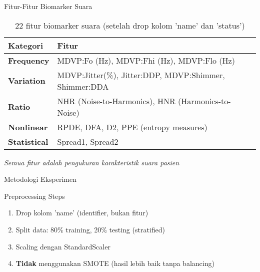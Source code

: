 \documentclass[aspectratio=169]{beamer}
\begin{document}
\begin{frame}{Fitur-Fitur Biomarker Suara}
\begin{table}
\centering
\small
\begin{tabular}{lp{7cm}}
\toprule
\textbf{Kategori} & \textbf{Fitur} \\
\midrule
\textbf{Frequency} & MDVP:Fo (Hz), MDVP:Fhi (Hz), MDVP:Flo (Hz) \\
\textbf{Variation} & MDVP:Jitter(\%), Jitter:DDP, MDVP:Shimmer, Shimmer:DDA \\
\textbf{Ratio} & NHR (Noise-to-Harmonics), HNR (Harmonics-to-Noise) \\
\textbf{Nonlinear} & RPDE, DFA, D2, PPE (entropy measures) \\
\textbf{Statistical} & Spread1, Spread2 \\
\bottomrule
\end{tabular}
\caption{22 fitur biomarker suara (setelah drop kolom 'name' dan 'status')}
\end{table}

\vspace{0.3cm}
\begin{center}
\textit{Semua fitur adalah pengukuran karakteristik suara pasien}
\end{center}
\end{frame}

\begin{frame}{Metodologi Eksperimen}

\vspace{0.5cm}
\begin{block}{Preprocessing Steps}
\begin{enumerate}
    \item Drop kolom 'name' (identifier, bukan fitur)
    \item Split data: 80\% training, 20\% testing (stratified)
    \item Scaling dengan StandardScaler
    \item \textbf{Tidak} menggunakan SMOTE (hasil lebih baik tanpa balancing)
\end{enumerate}
\end{block}
\end{frame}
\end{document}
